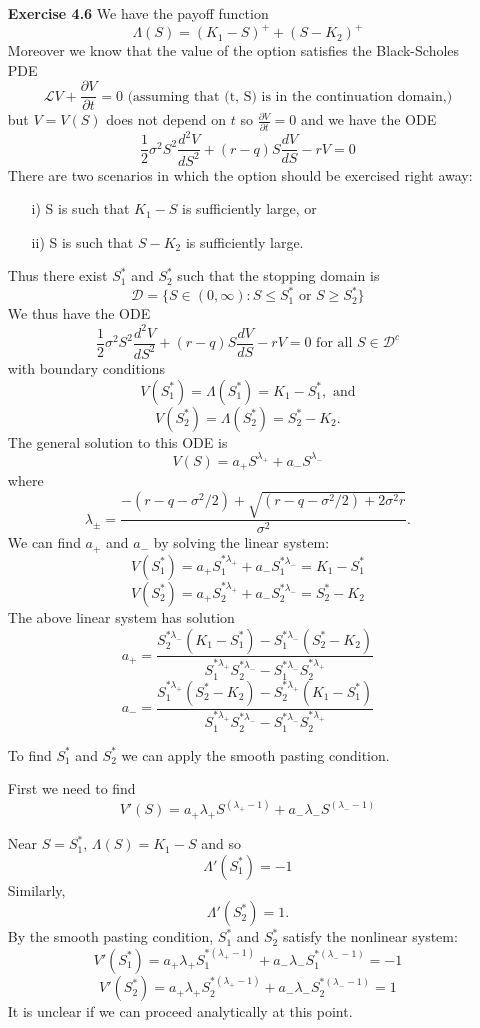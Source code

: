 \documentclass{article}[12pt,a4paper]
\begin{document}
\begin{enumerate}
  
   \item[\textbf{Exercise 4.6}]
  We have the payoff function
  $$\Lambda(S) =  (K_1 - S)^+ + (S - K_2)^+$$
  Moreover we know that the value of the option satisfies the Black-Scholes PDE
  $$\mathcal{L}V + \frac{\partial V}{\partial t} = 0 \mbox{ (assuming that (t, S) is in the continuation domain,)}$$
  but $V = V(S)$ does not depend on $t$ so $\frac{\partial V}{\partial t} = 0$ and we have the ODE
  $$\frac{1}{2}\sigma^2S^2\frac{d^2 V}{dS^2} + (r - q)S\frac{dV}{dS} - rV = 0$$
  There are two scenarios in which the option should be exercised right away:
  \begin{enumerate}
  \item[i)] S is such that $K_1 - S$ is sufficiently large, or
  \item[ii)] S is such that $S - K_2$ is sufficiently large.  
  \end{enumerate}
  Thus there exist $S_1^*$ and $S_2^*$ such that the stopping domain is
  $$\mathcal{D} = \{ S \in (0, \infty) : S \le S_1^* \mbox{ or } S \ge S_2^* \}$$
  We thus have the ODE
  $$\frac{1}{2}\sigma^2S^2\frac{d^2 V}{dS^2} + (r - q)S\frac{dV}{dS} - rV = 0 \mbox{ for all } S \in \mathcal{D}^c$$
  with boundary conditions
  $$V(S_1^*) = \Lambda(S_1^*) = K_1 - S_1^*, \mbox{ and}$$ 
  $$V(S_2^*) = \Lambda(S_2^*) = S_2^* - K_2.$$
  The general solution to this ODE is
  $$V(S) = a_+S^{\lambda_+} + a_-S^{\lambda_-}$$
  where
  $$\lambda_\pm = \frac{-(r - q - \sigma^2/2) + \sqrt{(r - q - \sigma^2/2) + 2\sigma^2r}}{\sigma^2}.$$
  We can find $a_+$ and $a_-$ by solving the linear system:
  $$V(S_1^*) =  a_+S_1^{*\lambda_+} + a_-S_1^{*\lambda_-} =  K_1 - S_1^*$$
  $$V(S_2^*) =  a_+S_2^{*\lambda_+} + a_-S_2^{*\lambda_-} = S_2^* - K_2$$
  The above linear system has solution
  $$a_+ = \frac{S_2^{*\lambda_-}(K_1 - S_1^*) - S_1^{*\lambda_-}(S_2^* - K_2)}
  		{S_1^{*\lambda_+}S_2^{*\lambda_-} - S_1^{*\lambda_-}S_2^{*\lambda_+}}$$
  $$a_- = \frac{S_1^{*\lambda_+}(S_2^* - K_2) - S_2^{*\lambda_+}(K_1 - S_1^*)}
  		{S_1^{*\lambda_+}S_2^{*\lambda_-} - S_1^{*\lambda_-}S_2^{*\lambda_+}}$$
  \pagebreak
  
  To find $S_1^*$ and $S_2^*$ we can apply the smooth pasting condition. \newline
  
  First we need to find 
  $$V'(S) = a_+\lambda_+S^{(\lambda_+ - 1)} + a_-\lambda_-S^{(\lambda_- - 1)}$$
  
  Near $S = S_1^*$, $\Lambda(S) = K_1 - S$ and so
  $$\Lambda'(S_1^*) = -1$$
  Similarly,
  $$\Lambda'(S_2^*) = 1.$$
  By the smooth pasting condition, $S_1^*$ and $S_2^*$ satisfy the nonlinear system:
  $$V'(S_1^*) = a_+\lambda_+S_1^{*(\lambda_+ - 1)} + a_-\lambda_-S_1^{*(\lambda_- - 1)} = -1$$
   $$V'(S_2^*) = a_+\lambda_+S_2^{*(\lambda_+ - 1)} + a_-\lambda_-S_2^{*(\lambda_- - 1)} = 1$$
   It is unclear if we can proceed analytically at this point.
  \pagebreak
  
  
  \end{enumerate}
  \pagebreak
\end{document}
